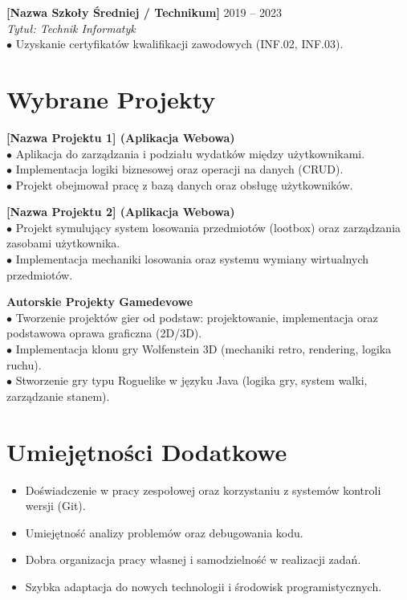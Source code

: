 \documentclass[10pt,a4paper,sans]{article}
\begin{document}
\begin{minipage}[t]{13.5cm}
    \vspace{10pt}
    \textbf{[Nazwa Szkoły Średniej / Technikum]} \hfill 2019 -- 2023 \\
    \textit{Tytuł: Technik Informatyk} \\
    $\bullet$ Uzyskanie certyfikatów kwalifikacji zawodowych (INF.02, INF.03).

    \section*{Wybrane Projekty}
    \textbf{[Nazwa Projektu 1] (Aplikacja Webowa)} \\
    $\bullet$ Aplikacja do zarządzania i podziału wydatków między użytkownikami. \\
    $\bullet$ Implementacja logiki biznesowej oraz operacji na danych (CRUD). \\
    $\bullet$ Projekt obejmował pracę z bazą danych oraz obsługę użytkowników.

    \vspace{5pt}
    \textbf{[Nazwa Projektu 2] (Aplikacja Webowa)} \\
    $\bullet$ Projekt symulujący system losowania przedmiotów (lootbox) oraz zarządzania zasobami użytkownika. \\
    $\bullet$ Implementacja mechaniki losowania oraz systemu wymiany wirtualnych przedmiotów.

    \vspace{5pt}
    \textbf{Autorskie Projekty Gamedevowe} \\
    $\bullet$ Tworzenie projektów gier od podstaw: projektowanie, implementacja oraz podstawowa oprawa graficzna (2D/3D). \\
    $\bullet$ Implementacja klonu gry Wolfenstein 3D (mechaniki retro, rendering, logika ruchu). \\
    $\bullet$ Stworzenie gry typu Roguelike w języku Java (logika gry, system walki, zarządzanie stanem).

    \section*{Umiejętności Dodatkowe}
    \begin{itemize}[leftmargin=*, noitemsep]
        \item Doświadczenie w pracy zespołowej oraz korzystaniu z systemów kontroli wersji (Git).
        \item Umiejętność analizy problemów oraz debugowania kodu.
        \item Dobra organizacja pracy własnej i samodzielność w realizacji zadań.
        \item Szybka adaptacja do nowych technologii i środowisk programistycznych.
    \end{itemize}


\end{minipage}
\end{document}
